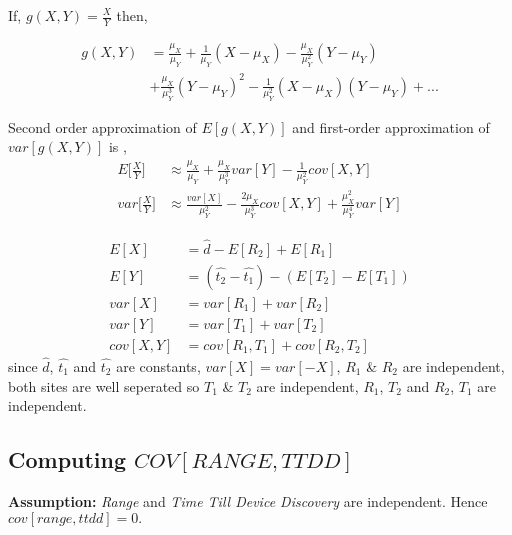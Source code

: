 \documentclass[10pt,twocolumn,letterpaper]{article}
\begin{document}
If, \( g(X, Y) = \frac{X}{Y} \) then,

\begin{equation}
\begin{split}
   g(X,Y) &= \frac{\mu_X}{\mu_Y} +  \frac{1}{\mu_Y} (X-\mu_X) - \frac{\mu_X}{\mu_Y^2}(Y-\mu_Y) \\ & + \frac{\mu_X}{\mu_Y^3} (Y-\mu_Y)^2 - \frac{1}{\mu_Y^2} (X-\mu_X)(Y-\mu_Y)  + ...
\end{split}
\end{equation}

Second order approximation of \(E[g(X,Y)]\) and first-order approximation of  \(var[g(X,Y)]\) is \cite{Benaroya05},
\begin{subequations}
\begin{align}
\label{expected_value_of_speed}
   E\bigg[\frac{X}{Y}\bigg] &\approx \frac{\mu_X}{\mu_Y} + \frac{\mu_X}{\mu_Y^3} var[Y]  - \frac{1}{\mu_Y^2} cov[X,Y] \\
\label{variance_of_speed}
   var\bigg[\frac{X}{Y}\bigg] &\approx \frac{var[X]}{\mu_Y^2} - \frac{2\mu_X}{\mu_Y^3}cov[X,Y] + \frac{\mu_X^2}{\mu_Y^4}var[Y]
\end{align}
\end{subequations}



\begin{subequations}
\begin{align}
   E[X] &= \hat{d} - E[R_2] + E[R_1] \\
   E[Y] &= ( \hat{t_2} - \hat{t_1} ) - ( E[T_2] - E[T_1] ) \\
   var[X] &= var[R_1] + var[R_2] \\
   var[Y] &= var[T_1] + var[T_2] \\
   cov[X,Y] &= cov[R_1, T_1] + cov[R_2, T_2]
\end{align}
\end{subequations}
since $\hat{d}$, $\hat{t_1}$ and $\hat{t_2}$ are constants, $var[X] = var[-X]$, $R_1$ \& $R_2$ are independent, both sites are well seperated so $T_1$ \& $T_2$ are independent, $R_1$, $T_2$ and $R_2$, $T_1$ are independent.


\subsection{Computing $COV[RANGE, TTDD]$ }
\textbf{Assumption:} \textit{Range} and \textit{Time Till Device Discovery} are independent. Hence \( cov[range,ttdd] = 0.\)
\end{document}
